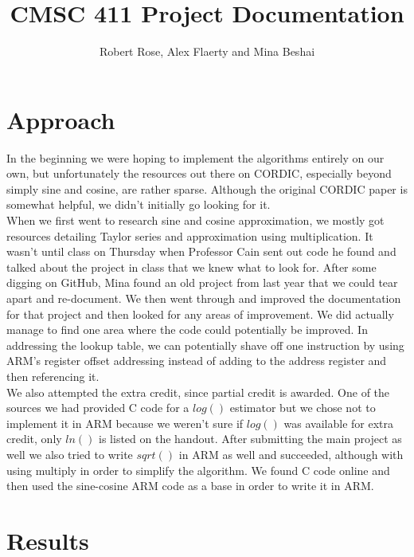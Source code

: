 \documentclass[11pt]{article}
\title{CMSC 411 Project Documentation}
\author{Robert Rose, Alex Flaerty and Mina Beshai}
\makeatletter
\let\inserttitle\@title
\let\insertauthor\@author
\makeatother
\begin{document}
\begin{center}
  \LARGE{\inserttitle}

  \Large{\insertauthor}
\end{center}

\section{Approach}

In the beginning we were hoping to implement the algorithms entirely on our own, but unfortunately
the resources out there on CORDIC, especially beyond simply sine and cosine, are rather sparse.
Although the original CORDIC paper is somewhat helpful, we didn't initially go looking for
it.\cite{volder1959cordic}\\

When we first went to research sine and cosine approximation, we mostly got resources detailing Taylor
series and approximation using multiplication.\cite{coranac} It wasn't until class on Thursday when
Professor Cain sent out code he found and talked about the project in class that we knew what to
look for.\cite{cainemail} After some digging on GitHub, Mina found an old project from last year that
we could tear apart and re-document.\cite{oldproj} We then went through and improved the documentation
for that project and then looked for any areas of improvement. We did actually manage to find one area
where the code could potentially be improved. In addressing the lookup table, we can potentially shave
off one instruction by using ARM's register offset addressing instead of adding to the address register
and then referencing it.\cite{registeroffsetmanual}\\

We also attempted the extra credit, since partial credit is awarded. One of the sources we had provided
C code for a $log()$ estimator but we chose not to implement it in ARM because we weren't sure if $log()$
was available for extra credit, only $ln()$ is listed on the handout.\cite{efunclog} After submitting the
main project as well we also tried to write $sqrt()$ in ARM as well and succeeded, although with using
multiply in order to simplify the algorithm. We found C code online and then used the sine-cosine ARM code
as a base in order to write it in ARM.\cite{sqrtcordic}

\section{Results}
\end{document}
